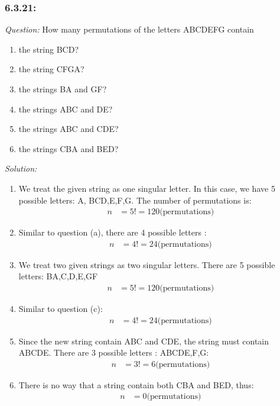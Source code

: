 \documentclass[a4paper]{article}
\begin{document}
\subsubsection*{6.3.21:}
\textit{Question:} How many permutations of the letters ABCDEFG contain
\begin{enumerate} [label = (\alph*)]
	\item the string BCD?
	\item the string CFGA?
	\item the strings BA and GF?
	\item the strings ABC and DE?
	\item the strings ABC and CDE?
	\item the strings CBA and BED?
\end{enumerate}
\textit{Solution:}
\begin{enumerate} [label = (\alph*)]
	\item We treat the given string as one singular letter. In this case, we have 5 possible letters: A, BCD,E,F,G. The number of permutations is:
	      \begin{align*}
		      n & = 5! = 120 \text{(permutations)}
	      \end{align*}
	\item Similar to question (a), there are 4 possible letters :
	      \begin{align*}
		      n & = 4! = 24 \text{(permutations)}
	      \end{align*}
	\item We treat two given strings as two singular letters. There are 5 possible letters: BA,C,D,E,GF
	      \begin{align*}
		      n & = 5! = 120 \text{(permutations)}
	      \end{align*}
	\item Similar to question (c):
	      \begin{align*}
		      n & = 4! = 24 \text{(permutations)}
	      \end{align*}
	\item Since the new string contain ABC and CDE, the string must contain ABCDE. There are 3 possible letters : ABCDE,F,G:
	      \begin{align*}
		      n & = 3! = 6 \text{(permutations)}
	      \end{align*}
	\item There is no way that a string contain both CBA and BED, thus:
	      \begin{align*}
		      n & = 0 \text{(permutations)}
	      \end{align*}
\end{enumerate}
\end{document}
